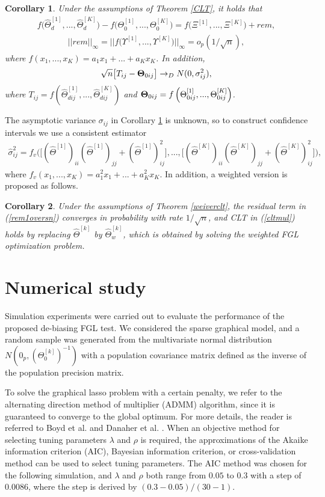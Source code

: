 \documentclass[review]{elsarticle}
\newcommand{\1}{{\bf 1}}
\newcommand{\0}{{\bf 0}}
\newcommand{\bqa}{\begin{eqnarray}}
\newcommand{\eqa}{\end{eqnarray}}
\newtheorem{corollary}{Corollary}
\begin{document}
\begin{corollary}\label{multipletest}
 Under the assumptions of Theorem \ref{CLT}, it holds that
\bqa\label{linear}
f\big(\widehat{{\Theta}}^{[1]}_{d},...,
\widehat{{\Theta}}^{[K]}_{d}\big)
-f\big(\Theta_{0}^{[1]},...,\Theta_{0}^{[K]}\big)
=f\big(\Xi^{[1]},...,\Xi^{[K]}\big)
+rem,
\eqa
\bqa\label{rem1oversn}
||rem||_{\infty}=||f\big(\Upsilon^{[1]},...,\Upsilon^{[K]}\big)||_{\infty}=o_{p}(1/\sqrt{n}),
\eqa
 where $f(x_1,...,x_K)=a_1x_1+...+a_Kx_K$.
 In addition,
\bqa\label{cltmul}
\sqrt{n}\big[T_{ij}-{\bf \Theta}_{0ij}\big]
\to_{D}N(0,\sigma_{ij}^2),
\eqa
 where $T_{ij}=f\left(\widehat{{\Theta}}^{[1]}_{dij},...,\widehat{{\Theta}}^{[K]}_{dij}\right)$ and ${\bf \Theta}_{0ij}=f\left(\Theta_{0ij}^{[1]},...,\Theta_{0ij}^{[K]}\right)$.
\end{corollary}
 The asymptotic variance $\sigma_{ij}$ in Corollary \ref{multipletest} is unknown, so to construct confidence intervals we use a consistent estimator
\bqa
\hat\sigma_{ij}^2=f_v\big(\big[(\widehat{\Theta}^{[1]})_{ii}(\widehat{\Theta}^{[1]})_{jj}
 +(\widehat{\Theta}^{[1]})_{ij}^2\big],...,\big[(\widehat{\Theta}^{[K]})_{ii}(\widehat{\Theta}^{[K]})_{jj}
 +(\widehat{\Theta}^{[K]})_{ij}^2\big]\big),
\eqa
 where $f_v(x_1,...,x_K)=a_1^2x_1+...+a_K^2x_K$.
 In addition, a weighted version is proposed as follows.

\begin{corollary}
 Under the assumptions of Theorem \ref{weiverclt}, the residual term in (\ref{rem1oversn}) converges in probability with rate $1/\sqrt{n}$, and CLT in (\ref{cltmul}) holds by replacing $\widehat{\Theta}^{[k]}$ by $\widehat{\Theta}_w^{[k]}$, which is obtained by solving the weighted FGL optimization problem.
\end{corollary}


\section{Numerical study}

Simulation experiments were carried out to evaluate the performance of the proposed de-biasing FGL test.
 We considered the sparse graphical model, and a random sample was generated from the multivariate normal distribution $N(0_p,(\Theta_0^{[k]})^{-1})$ with a population covariance matrix defined as the inverse of the population precision matrix.

 To solve the graphical lasso problem with a certain penalty, we refer to the alternating direction method of multiplier (ADMM) algorithm, since it is guaranteed to converge to the global optimum. For more details, the reader is referred to Boyd et al. \cite{boyd2004convex} and Danaher et al. \cite{Danaher2014The}.
 When an objective method for selecting tuning parameters $\lambda$ and $\rho$ is required, the approximations of the Akaike information criterion (AIC), Bayesian information criterion, or cross-validation method can be used to select tuning parameters.
 The AIC method was chosen for the following simulation, and $\lambda$ and $\rho$ both range from $0.05$ to $0.3$ with a step of $0.0086$, where the step is derived by $(0.3-0.05)/(30-1)$.
\end{document}
